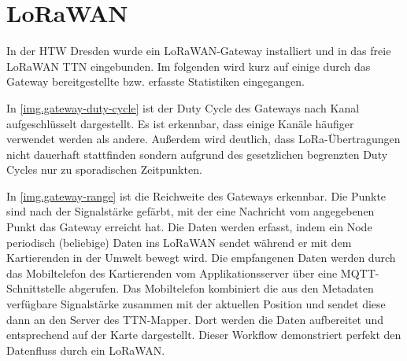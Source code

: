 \section{LoRaWAN}
In der HTW Dresden wurde ein LoRaWAN-Gateway installiert und in das freie LoRaWAN \gls{TTN} eingebunden.
Im folgenden wird kurz auf einige durch das Gateway bereitgestellte bzw. erfasste Statistiken eingegangen.

In \autoref{img.gateway-duty-cycle} ist der Duty Cycle des Gateways nach Kanal aufgeschlüsselt dargestellt.
Es ist erkennbar, dass einige Kanäle häufiger verwendet werden als andere.
Außerdem wird deutlich, dass LoRa-Übertragungen nicht dauerhaft stattfinden sondern aufgrund des gesetzlichen begrenzten Duty Cycles nur zu sporadischen Zeitpunkten.

In \autoref{img.gateway-range} ist die Reichweite des Gateways erkennbar.
Die Punkte sind nach der Signalstärke gefärbt, mit der eine Nachricht vom angegebenen Punkt das Gateway erreicht hat.
Die Daten werden erfasst, indem ein Node periodisch (beliebige) Daten ins LoRaWAN sendet während er mit dem Kartierenden in der Umwelt bewegt wird.
Die empfangenen Daten werden durch das Mobiltelefon des Kartierenden vom Applikationsserver über eine MQTT-Schnittstelle abgerufen.
Das Mobiltelefon kombiniert die aus den Metadaten verfügbare Signalstärke zusammen mit der aktuellen Position und sendet diese dann an den Server des TTN-Mapper.
Dort werden die Daten aufbereitet und entsprechend auf der Karte dargestellt.
Dieser Workflow demonstriert perfekt den Datenfluss durch ein LoRaWAN.
